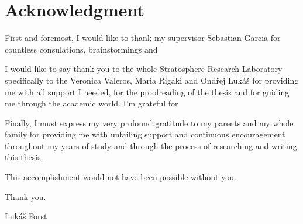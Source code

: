 \vspace*{\fill}

\section*{Acknowledgment}
First and foremost, I would like to thank my supervisor Sebastian Garcia for countless consulations, brainstormings and 


I would like to say thank you to the whole Stratosphere Research Laboratory specifically to the Veronica Valeros, Maria Rigaki and Ondřej Lukáš for providing me with all support I needed, for the proofreading of the thesis and for guiding me through the academic world.
I'm grateful for 

\noindent
Finally, I must express my very profound gratitude to my parents and my whole family for providing me with unfailing support and continuous encouragement throughout my years of study and through the process of researching and writing this thesis. 

\bigskip \noindent
This accomplishment would not have been possible without you.
  
\bigskip \noindent
Thank you.
  
\bigskip \noindent
\hspace*{\fill} Lukáš Forst

\thispagestyle{empty}

\cleardoublepage